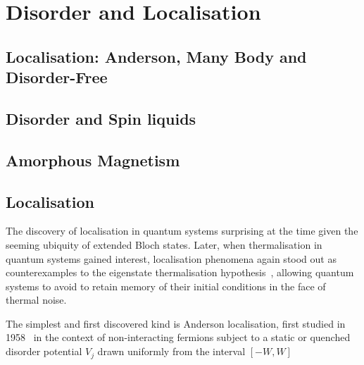 \hypertarget{bg-disorder-and-localisation}{%
\section{Disorder and Localisation}\label{bg-disorder-and-localisation}}

\hypertarget{localisation-anderson-many-body-and-disorder-free}{%
\subsection{Localisation: Anderson, Many Body and Disorder-Free}\label{localisation-anderson-many-body-and-disorder-free}}

\hypertarget{disorder-and-spin-liquids}{%
\subsection{Disorder and Spin liquids}\label{disorder-and-spin-liquids}}

\hypertarget{amorphous-magnetism}{%
\subsection{Amorphous Magnetism}\label{amorphous-magnetism}}

\begin{Shaded}
\begin{Highlighting}[]

\end{Highlighting}
\end{Shaded}

\hypertarget{localisation}{%
\subsection{Localisation}\label{localisation}}

The discovery of localisation in quantum systems surprising at the time given the seeming ubiquity of extended Bloch states. Later, when thermalisation in quantum systems gained interest, localisation phenomena again stood out as counterexamples to the eigenstate thermalisation hypothesis~\autocite{abaninRecentProgressManybody2017,srednickiChaosQuantumThermalization1994}, allowing quantum systems to avoid to retain memory of their initial conditions in the face of thermal noise.

The simplest and first discovered kind is Anderson localisation, first studied in 1958~\autocite{andersonAbsenceDiffusionCertain1958} in the context of non-interacting fermions subject to a static or quenched disorder potential \(V_j\) drawn uniformly from the interval \([-W,W]\)


